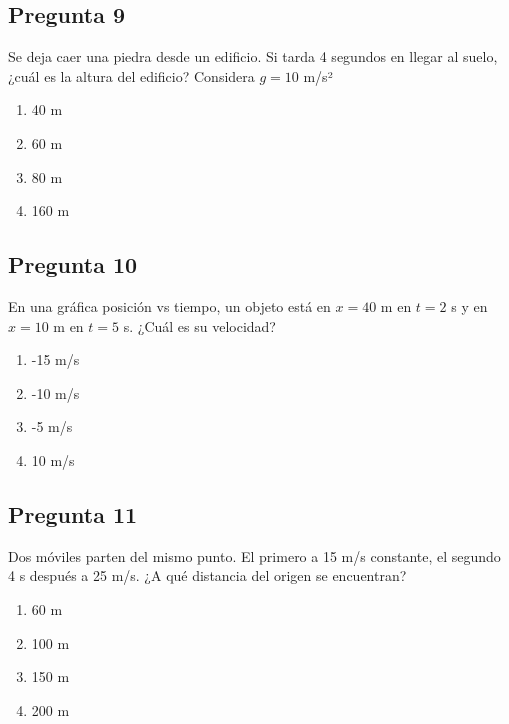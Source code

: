 \begin{preguntabox}
\subsection{Pregunta 9}
Se deja caer una piedra desde un edificio. Si tarda 4 segundos en llegar al suelo, ¿cuál es la altura del edificio? Considera $g = 10$ m/s²

\begin{enumerate}
    \item[A)] 40 m
    \item[B)] 60 m
    \item[C)] 80 m
    \item[D)] 160 m
\end{enumerate}
\end{preguntabox}

\begin{preguntabox}
\subsection{Pregunta 10}
En una gráfica posición vs tiempo, un objeto está en $x = 40$ m en $t = 2$ s y en $x = 10$ m en $t = 5$ s. ¿Cuál es su velocidad?

\begin{enumerate}
    \item[A)] -15 m/s
    \item[B)] -10 m/s
    \item[C)] -5 m/s
    \item[D)] 10 m/s
\end{enumerate}
\end{preguntabox}


\begin{preguntabox}
\subsection{Pregunta 11}
Dos móviles parten del mismo punto. El primero a 15 m/s constante, el segundo 4 s después a 25 m/s. ¿A qué distancia del origen se encuentran?

\begin{enumerate}
    \item[A)] 60 m
    \item[B)] 100 m
    \item[C)] 150 m
    \item[D)] 200 m
\end{enumerate}
\end{preguntabox}

